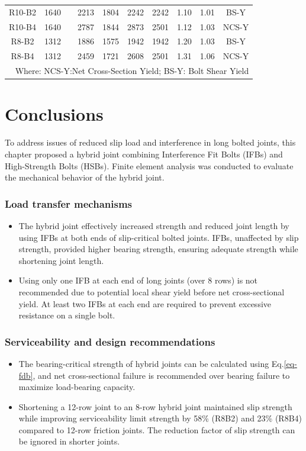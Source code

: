 \begin{table}[htbp]
{\begin{tabular}{@{}cccccccccc@{}}
R10-B2    & 1640 &                       & 2213 & 1804 & 2242 & 2242 & 1.10 & 1.01 & BS-Y    \\
R10-B4    & 1640 &                       & 2787 & 1844 & 2873 & 2501 & 1.12 & 1.03 & NCS-Y \\
R8-B2     & 1312 &                       & 1886 & 1575 & 1942 & 1942 & 1.20 & 1.03 & BS-Y    \\
R8-B4     & 1312 &                       & 2459 & 1721 & 2608 & 2501 & 1.31 & 1.06 & NCS-Y \\ \bottomrule
\multicolumn{10}{r}{Where: NCS-Y:Net Cross-Section Yield; BS-Y: Bolt Shear Yield}
\end{tabular}}
\end{table}



\section{Conclusions}

To address issues of reduced slip load and interference in long bolted joints, this chapter proposed a hybrid joint combining Interference Fit Bolts (IFBs) and High-Strength Bolts (HSBs). Finite element analysis was conducted to evaluate the mechanical behavior of the hybrid joint.

\subsubsection*{Load transfer mechanisms}
\begin{itemize}
    \item The hybrid joint effectively increased strength and reduced joint length by using IFBs at both ends of slip-critical bolted joints. IFBs, unaffected by slip strength, provided higher bearing strength, ensuring adequate strength while shortening joint length.
    \item Using only one IFB at each end of long joints (over 8 rows) is not recommended due to potential local shear yield before net cross-sectional yield. At least two IFBs at each end are required to prevent excessive resistance on a single bolt.
\end{itemize}

\subsubsection*{Serviceability and design recommendations}
\begin{itemize}
    \item The bearing-critical strength of hybrid joints can be calculated using Eq.\ref{eq-fdb}, and net cross-sectional failure is recommended over bearing failure to maximize load-bearing capacity.
    \item Shortening a 12-row joint to an 8-row hybrid joint maintained slip strength while improving serviceability limit strength by 58\% (R8B2) and 23\% (R8B4) compared to 12-row friction joints. The reduction factor of slip strength can be ignored in shorter joints.
\end{itemize}


